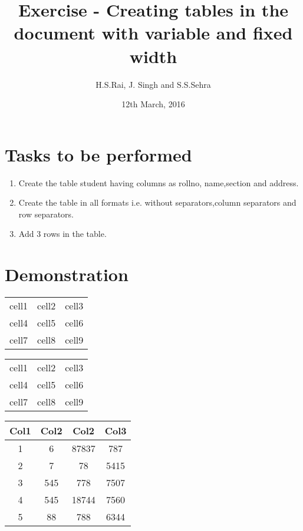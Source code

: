 \documentclass{article}
\title{Exercise  - Creating tables in the document with variable and fixed width}
\author{H.S.Rai, J. Singh and S.S.Sehra}
\date{12th March, 2016}
\begin{document}
	\maketitle	
	\section*{Tasks to be performed}
	\begin{enumerate}	
		\item Create the table student having columns as rollno, name,section and address.
		\item Create the table in all formats i.e. without separators,column separators and row separators.
		\item Add 3 rows in the table.
	\end{enumerate}
	\section*{Demonstration}
\begin{center}
\begin{tabular}{ l r c }
  cell1 & cell2 & cell3 \\ 
  cell4 & cell5 & cell6 \\  
  cell7 & cell8 & cell9    
\end{tabular}
\end{center}
\begin{center}
	\begin{tabular}{ | c | c | c | } 
		\hline
		cell1 & cell2 & cell3 \\ 
		cell4 & cell5 & cell6 \\ 
		cell7 & cell8 & cell9 \\ 
		\hline
	\end{tabular}
\end{center}

\vspace{1cm} %

\begin{center}
	\begin{tabular}{||c c c c||} 
		\hline
		Col1 & Col2 & Col2 & Col3 \\ 
		\hline\hline
		1 & 6 & 87837 & 787 \\ 
		\hline
		2 & 7 & 78 & 5415 \\
		\hline
		3 & 545 & 778 & 7507 \\
		\hline
		4 & 545 & 18744 & 7560 \\
		\hline
		5 & 88 & 788 & 6344 \\ 
		\hline
	\end{tabular}
\end{center}
\end{document}
